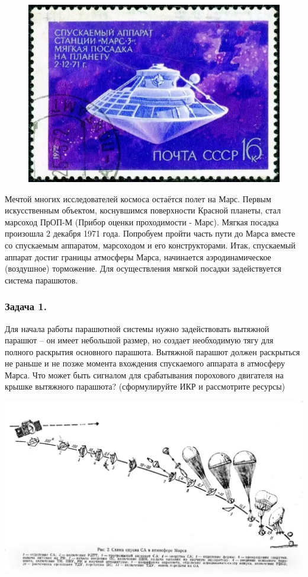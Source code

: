 \documentclass[11pt,a4paper]{article}
\begin{document}
\begin{figure}\vspace*{-1em}\centering
\includegraphics[width=.25\textwidth]{jEMlaM.jpg}
\end{figure}
Мечтой многих исследователей космоса остаётся полет на Марс. Первым
искусственным объектом, коснувшимся поверхности Красной планеты, стал марсоход
ПрОП-М (Прибор оценки проходимости - Марс). Мягкая посадка произошла 2 декабря
1971 года. Попробуем пройти часть пути до Марса вместе со спускаемым
аппаратом, марсоходом и его конструкторами. Итак, спускаемый аппарат достиг
границы атмосферы Марса, начинается аэродинамическое (воздушное)
торможение. Для осуществления мягкой посадки задействуется система парашютов.

\subsubsection*{Задача 1.}
Для начала работы парашютной системы нужно задействовать вытяжной парашют – он
имеет небольшой размер, но создает необходимую тягу для полного раскрытия
основного парашюта. Вытяжной парашют должен раскрыться не раньше и не позже
момента вхождения спускаемого аппарата в атмосферу Марса. Что может быть
сигналом для срабатывания порохового двигателя на крышке вытяжного парашюта?
(сформулируйте ИКР и рассмотрите ресурсы)
\begin{center}
\includegraphics[width=.95\textwidth]{12uaYg.png}
\end{center}
\end{document}
